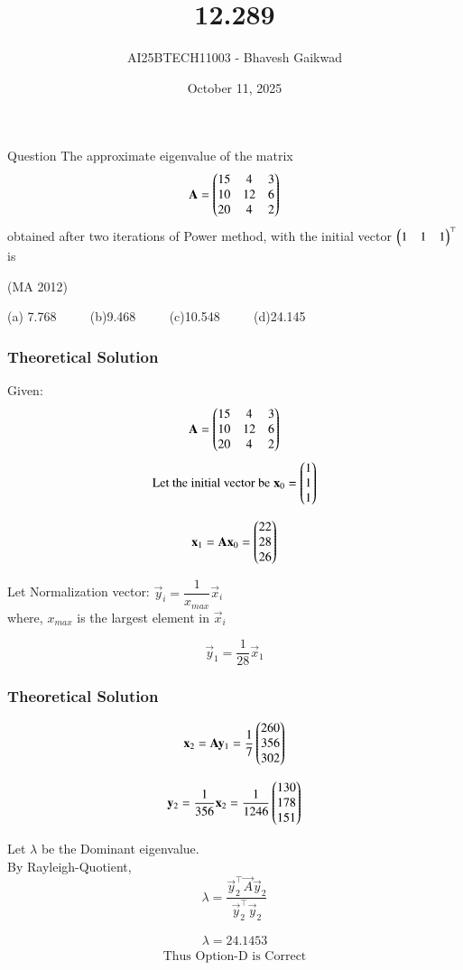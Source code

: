 \documentclass{beamer}
\title
{12.289}
\date{October 11, 2025}
\author 
{AI25BTECH11003 - Bhavesh Gaikwad}
\begin{document}
\frame{\titlepage}
\begin{frame}{Question}
The approximate eigenvalue of the matrix 
$$\mathbf{A} = \begin{pmatrix}15 & 4 & 3 \\ 10 & 12 & 6 \\ 20 & 4 & 2\end{pmatrix}$$
obtained after two iterations of Power method, with the initial vector $\begin{pmatrix}1 & 1 & 1\end{pmatrix}^\top$ is 

\hfill{(MA 2012)}

(a) 7.768 $\qquad$ (b)9.468 $\qquad$ (c)10.548 $\qquad$ (d)24.145
\end{frame}


\begin{frame}[fragile]
    \frametitle{Theoretical Solution}
Given: 
$$\mathbf{A} = \begin{pmatrix}15 & 4 & 3 \\ 10 & 12 & 6 \\ 20 & 4 & 2\end{pmatrix}$$
$$\text{Let the initial vector be} \; \mathbf{x}_0 = \begin{pmatrix}1 \\ 1 \\ 1\end{pmatrix}$$

\begin{equation}
\mathbf{x}_{1} = \mathbf{A}\mathbf{x}_0 = \begin{pmatrix}22 \\ 28 \\ 26\end{pmatrix}    
\end{equation}


Let Normalization vector: $\vec{y}_i = \dfrac{1}{x_{max}}\vec{x}_i$\\
where, $x_{max}$ is the largest element in $\vec{x}_i$

\begin{equation}
\vec{y}_1 = \frac{1}{28}\vec{x}_1   
\end{equation}
\end{frame}

\begin{frame}[fragile]
    \frametitle{Theoretical Solution}
\begin{equation}
\mathbf{x}_2 = \mathbf{A}\mathbf{y}_1 = \frac{1}{7}\begin{pmatrix}260 \\ 356 \\ 302\end{pmatrix} 
\end{equation}

\begin{equation}
    \mathbf{y}_2 = \frac{1}{356} \mathbf{x}_2 = \frac{1}{1246}\begin{pmatrix}130 \\ 178 \\ 151\end{pmatrix}
\end{equation}

Let $\lambda$ be the Dominant eigenvalue.\\

By Rayleigh-Quotient,
\begin{equation}
    \lambda = \dfrac{\vec{y}_2^\top\vec{A}\vec{y}_2}{\vec{y}_2^\top\vec{y}_2}
\end{equation}

\begin{align*}
    \boxed{\lambda = 24.1453}
\end{align*}
\begin{align*}
\boxed{\text{Thus Option-D is Correct}}
\end{align*}
\end{frame}
\end{document}
